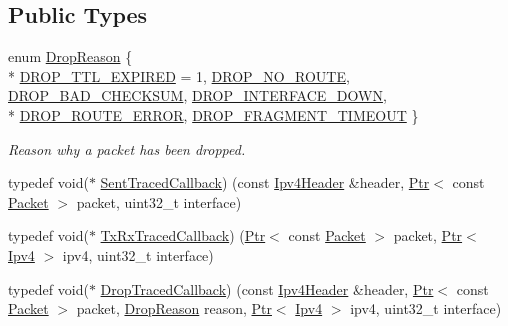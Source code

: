 \subsection*{Public Types}
\begin{DoxyCompactItemize}
\item 
enum \hyperlink{classns3_1_1Ipv4L3Protocol_a05e7403d60c79529257c4cffdd994da1}{Drop\+Reason} \{ \\*
\hyperlink{classns3_1_1Ipv4L3Protocol_a05e7403d60c79529257c4cffdd994da1a95ecb5b7c1affd7ca7a6d3d34c38cd40}{D\+R\+O\+P\+\_\+\+T\+T\+L\+\_\+\+E\+X\+P\+I\+R\+ED} = 1, 
\hyperlink{classns3_1_1Ipv4L3Protocol_a05e7403d60c79529257c4cffdd994da1a6934d63c397ae1ec077fdfcdeb90eb40}{D\+R\+O\+P\+\_\+\+N\+O\+\_\+\+R\+O\+U\+TE}, 
\hyperlink{classns3_1_1Ipv4L3Protocol_a05e7403d60c79529257c4cffdd994da1a14938788d12f864657e5a3aa5d3e26fd}{D\+R\+O\+P\+\_\+\+B\+A\+D\+\_\+\+C\+H\+E\+C\+K\+S\+UM}, 
\hyperlink{classns3_1_1Ipv4L3Protocol_a05e7403d60c79529257c4cffdd994da1a8f40f145dce3e9f21e1218ce125a048d}{D\+R\+O\+P\+\_\+\+I\+N\+T\+E\+R\+F\+A\+C\+E\+\_\+\+D\+O\+WN}, 
\\*
\hyperlink{classns3_1_1Ipv4L3Protocol_a05e7403d60c79529257c4cffdd994da1aeb35be325e705553daacbf36f035c8f5}{D\+R\+O\+P\+\_\+\+R\+O\+U\+T\+E\+\_\+\+E\+R\+R\+OR}, 
\hyperlink{classns3_1_1Ipv4L3Protocol_a05e7403d60c79529257c4cffdd994da1afaf46ea7a6354ebb1e66e891123a9fbb}{D\+R\+O\+P\+\_\+\+F\+R\+A\+G\+M\+E\+N\+T\+\_\+\+T\+I\+M\+E\+O\+UT}
 \}\begin{DoxyCompactList}\small\item\em Reason why a packet has been dropped. \end{DoxyCompactList}
\item 
typedef void($\ast$ \hyperlink{classns3_1_1Ipv4L3Protocol_acc7bcfb12c40722923247fc853e47f73}{Sent\+Traced\+Callback}) (const \hyperlink{classns3_1_1Ipv4Header}{Ipv4\+Header} \&header, \hyperlink{classns3_1_1Ptr}{Ptr}$<$ const \hyperlink{classns3_1_1Packet}{Packet} $>$ packet, uint32\+\_\+t interface)
\item 
typedef void($\ast$ \hyperlink{classns3_1_1Ipv4L3Protocol_a7da7189506cc53d778ccc2b6cba88e2d}{Tx\+Rx\+Traced\+Callback}) (\hyperlink{classns3_1_1Ptr}{Ptr}$<$ const \hyperlink{classns3_1_1Packet}{Packet} $>$ packet, \hyperlink{classns3_1_1Ptr}{Ptr}$<$ \hyperlink{classns3_1_1Ipv4}{Ipv4} $>$ ipv4, uint32\+\_\+t interface)
\item 
typedef void($\ast$ \hyperlink{classns3_1_1Ipv4L3Protocol_a50425a8bb439831d9134fc6061481c53}{Drop\+Traced\+Callback}) (const \hyperlink{classns3_1_1Ipv4Header}{Ipv4\+Header} \&header, \hyperlink{classns3_1_1Ptr}{Ptr}$<$ const \hyperlink{classns3_1_1Packet}{Packet} $>$ packet, \hyperlink{classns3_1_1Ipv4L3Protocol_a05e7403d60c79529257c4cffdd994da1}{Drop\+Reason} reason, \hyperlink{classns3_1_1Ptr}{Ptr}$<$ \hyperlink{classns3_1_1Ipv4}{Ipv4} $>$ ipv4, uint32\+\_\+t interface)
\end{DoxyCompactItemize}
